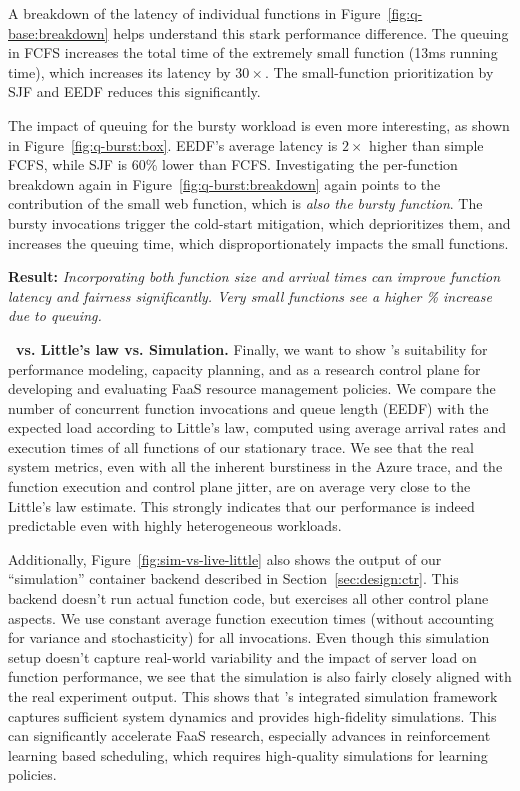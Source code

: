 A breakdown of the latency of individual functions in Figure~\ref{fig:q-base:breakdown} helps understand this stark performance difference.
The queuing in FCFS increases the total time of the extremely small  function (13ms running time), which increases its latency by $30\times$.
The small-function prioritization by SJF and EEDF reduces this significantly. 

The impact of queuing for the bursty workload is even more interesting, as shown in Figure~\ref{fig:q-burst:box}.
EEDF's average latency is $2\times$ higher than simple FCFS, while SJF is 60\% lower than FCFS. 
Investigating the per-function breakdown again in Figure~\ref{fig:q-burst:breakdown} again points to the contribution of the small web function, which is \emph{also the bursty function}.
The bursty invocations trigger the cold-start mitigation, which deprioritizes them, and increases the queuing time, which disproportionately impacts the small functions.

\noindent \textbf{Result:} \emph{Incorporating both function size and arrival times can improve function latency and fairness significantly. Very small functions see a higher \% increase due to queuing.}




\noindent \textbf{\sysname~vs. Little's law vs. Simulation.}
Finally, we want to show \sysname's suitability for performance modeling, capacity planning, and as a research control plane for developing and evaluating FaaS resource management policies.
We compare the number of concurrent function invocations and queue length (EEDF) with the expected load according to Little's law, computed using average arrival rates and execution times of all functions of our stationary trace. 
We see that the real system metrics, even with all the inherent burstiness in the Azure trace, and the function execution and control plane jitter, are on average very close to the Little's law estimate.
This strongly indicates that our performance is indeed predictable even with highly heterogeneous workloads.

Additionally, Figure~\ref{fig:sim-vs-live-little} also shows the output of our ``simulation'' container backend described in Section~\ref{sec:design:ctr}.
This backend doesn't run actual function code, but exercises all other control plane aspects.
We use constant average function execution times (without accounting for variance and stochasticity) for all invocations.
Even though this simulation setup doesn't capture real-world variability and the impact of server load on function performance, we see that the simulation is also fairly closely aligned with the real experiment output.
This shows that \sysname's integrated simulation framework captures sufficient system dynamics and provides high-fidelity simulations.
This can significantly accelerate FaaS research, especially advances in reinforcement learning based scheduling, which requires high-quality simulations for learning policies. 

